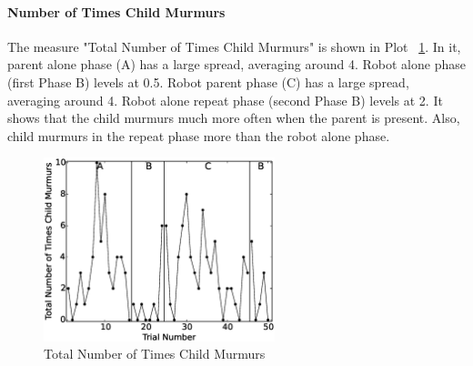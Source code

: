 \paragraph{Number of Times Child Murmurs}
The measure "Total Number of Times Child Murmurs" is shown in Plot \ \ref{fig:13TotalNumberofTimesChildMurmurs}.  In it, parent alone phase (A) has a large spread, averaging around 4.  Robot alone phase (first Phase B) levels at 0.5.  Robot parent phase (C) has a large spread, averaging around 4.  Robot alone repeat phase (second Phase B) levels at 2.  It shows that the child murmurs much more often when the parent is present.  Also, child murmurs in the repeat phase more than the robot alone phase.
\begin{figure} [h]
	\centering
	\includegraphics[width=0.6\textwidth]{./img/data_analysis/13TotalNumberofTimesChildMurmurs.eps}
	\caption{Total Number of Times Child Murmurs}
	\label{fig:13TotalNumberofTimesChildMurmurs}
\end{figure}


